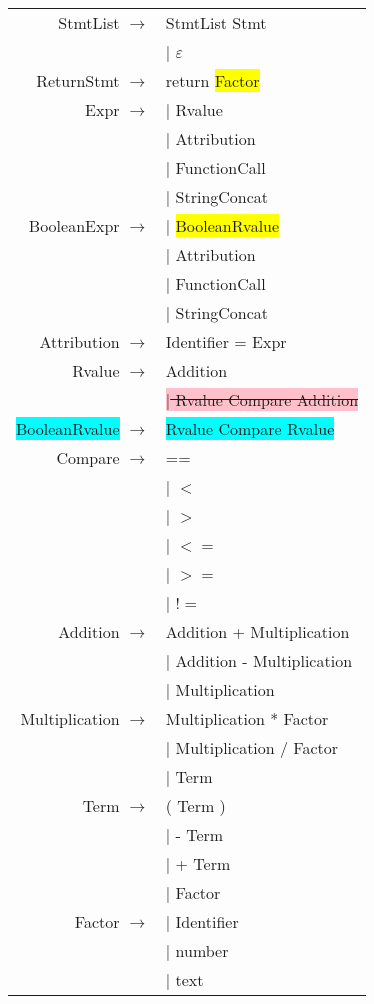 \documentclass[12pt]{article}
\begin{document}
\begin{longtable}{ r l }
	StmtList		$\rightarrow$ 	& StmtList Stmt \\
									& $|$ $\varepsilon$ \\
	ReturnStmt		$\rightarrow$ 	& return \colorbox{yellow}{Factor} \\
	Expr			$\rightarrow$ 	& $|$ Rvalue \\
									& $|$ Attribution \\
									& $|$ FunctionCall \\
									& $|$ StringConcat \\
	BooleanExpr		$\rightarrow$ 	& $|$ \colorbox{yellow}{BooleanRvalue} \\
									& $|$ Attribution \\
									& $|$ FunctionCall \\
									& $|$ StringConcat \\
	Attribution		$\rightarrow$ 	& Identifier = Expr \\
	Rvalue			$\rightarrow$ 	& Addition \\
									& \colorbox{pink}{\sout{$|$ Rvalue Compare Addition}} \\
	\colorbox{cyan}{BooleanRvalue}	$\rightarrow$ 	& \colorbox{cyan}{Rvalue Compare Rvalue} \\
	Compare			$\rightarrow$ 	& ==  \\
									& $|$ $<$ \\
									& $|$ $>$ \\
									& $|$ $<=$ \\
									& $|$ $>=$ \\
									& $|$ $!=$ \\
	Addition		$\rightarrow$ 	& Addition + Multiplication \\
									& $|$ Addition - Multiplication \\
									& $|$ Multiplication \\
	Multiplication	$\rightarrow$ 	& Multiplication * Factor \\
									& $|$ Multiplication / Factor \\
									& $|$ Term \\
	Term			$\rightarrow$ 	& ( Term ) \\
									& $|$ - Term \\
									& $|$ + Term \\
									& $|$ Factor \\
	Factor			$\rightarrow$ 	& $|$  Identifier \\
									& $|$  number \\
									& $|$  text \\

\end{longtable}
\end{document}
